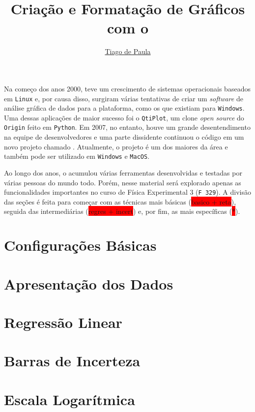 \documentclass{article}
\title{Criação e Formatação de Gráficos com o}\softwarelogo
\author{\href{mailto:t187679@dac.unicamp.br}{Tiago de Paula}}
\date{}
\begin{document}
    \maketitle

    Na começo dos anos 2000, teve um crescimento de sistemas operacionais baseados em \texttt{Linux} e, por causa disso, surgiram várias tentativas de criar um \textit{software} de análise gráfica de dados para a plataforma, como os que existiam para \texttt{Windows}. Uma dessas aplicações de maior sucesso foi o \texttt{QtiPlot}, um clone \textit{open source} do \texttt{Origin} feito em \texttt{Python}. Em 2007, no entanto, houve um grande desentendimento na equipe de desenvolvedores e uma parte dissidente continuou o código em um novo projeto chamado \software. Atualmente, o projeto é um dos maiores da área e também pode ser utilizado em \texttt{Windows} e \texttt{MacOS}.

    Ao longo dos anos, o \software acumulou várias ferramentas desenvolvidas e testadas por várias pessoas do mundo todo. Porém, nesse material será explorado apenas as funcionalidades importantes no curso de Física Experimental 3 (\texttt{F 329}). A divisão das seções é feita para começar com as técnicas mais básicas (\colorbox{red}{basico + reta}), seguida das intermediárias (\colorbox{red}{regres + incert}) e, por fim, as mais específicas (\colorbox{red}{*}).

    \section{Configurações Básicas} \label{sec:basico}
        

    \section{Apresentação dos Dados} \label{sec:reta}

    \section{Regressão Linear} \label{sec:regres}

    \section{Barras de Incerteza} \label{sec:incert}

    \section{Escala Logarítmica} \label{sec:escala}
\end{document}
